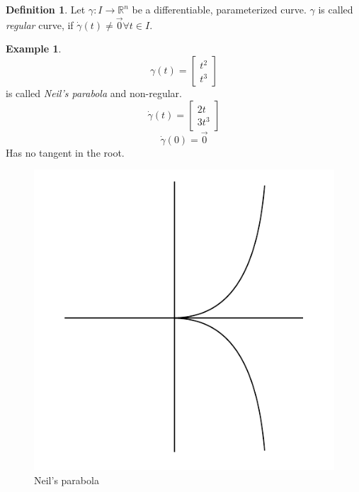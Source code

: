 \documentclass[a4paper,landscape,twocolumn]{article}
\theoremstyle{definition}
\newtheorem{defi}{Definition}
\newtheorem{ex}{Example}
\begin{document}
\begin{defi}
  Let $\gamma: I \to \mathbb R^n$ be a differentiable, parameterized curve.
  $\gamma$ is called \emph{regular} curve, if $\dot\gamma(t) \neq \vec0 \forall t \in I$.
\end{defi}

\begin{ex}
  \[ \gamma(t) = \begin{bmatrix} t^2 \\ t^3 \end{bmatrix} \]
  is called \emph{Neil's parabola} and non-regular.
  \[ \dot\gamma(t) = \begin{bmatrix} 2t \\ 3t^3 \end{bmatrix} \]
  \[ \dot\gamma(0) = \vec0 \]
  Has no tangent in the root.
\end{ex}

\begin{figure}[!h]
  \begin{center}
    \includegraphics{img/neils_parabola.pdf}
    \caption{Neil's parabola}
  \end{center}
\end{figure}
\end{document}
